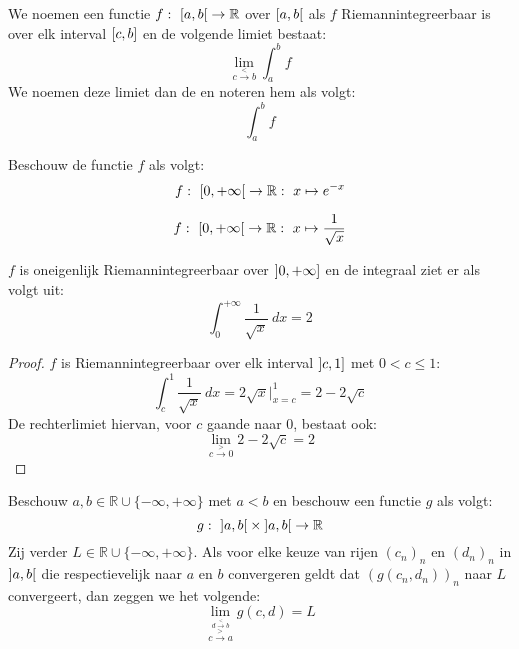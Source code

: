 \documentclass[main.tex]{subfiles}
\begin{document}
\begin{de}
  We noemen een functie $f:\ \interval[open right]{a}{b} \rightarrow \mathbb{R}$   over $\interval[open right]{a}{b}$ als $f$ Riemannintegreerbaar is over elk interval $\interval{c}{b}$ en de volgende limiet bestaat:
  \[ \lim_{c\overset{<}{\rightarrow} b}\int_{a}^{b}f \]
  We noemen deze limiet dan de  en noteren hem als volgt:
  \[ \int_{a}^{b}f \]
\end{de}

\begin{vb}
  Beschouw de functie $f$ als volgt:
  \[ f:\ \interval[open right]{0}{+\infty} \rightarrow \mathbb{R}:\ x \mapsto e^{-x}\]

  \noindent
  \begin{minipage}{.45\textwidth}
    \begin{figure}[H]
      \centering
    \end{figure}
  \end{minipage}
  \begin{minipage}{.45\textwidth}
    \[ f:\ \interval[open right]{0}{+\infty} \rightarrow \mathbb{R}:\ x \mapsto \frac{1}{\sqrt{x}} \]
  \end{minipage}

  $f$ is oneigenlijk Riemannintegreerbaar over $\interval[open left]{0}{+\infty}$ en de integraal ziet er als volgt uit:
  \[ \int_{0}^{+\infty}\frac{1}{\sqrt{x}}\ dx = 2 \]

  \begin{proof}
    $f$ is Riemannintegreerbaar over elk interval $\interval[open left]{c}{1}$ met $0 < c \le 1$:
    \[ \int_{c}^{1}\frac{1}{\sqrt{x}}\ dx = 2\sqrt{x}\big|_{x=c}^{1} = 2-2\sqrt{c} \]
    De rechterlimiet hiervan, voor $c$ gaande naar $0$, bestaat ook:
    \[ \lim_{c \overset{>}{\rightarrow} 0} 2-2\sqrt{c} = 2 \]
  \end{proof}
\end{vb}

\begin{de}
  Beschouw $a,b \in \mathbb{R} \cup \{ -\infty, +\infty \}$ met $a < b$ en beschouw een functie $g$ als volgt:
  \[ g:\ \interval[open]{a}{b} \times \interval[open]{a}{b} \rightarrow \mathbb{R} \]
  Zij verder $L \in \mathbb{R} \cup \{ -\infty, +\infty \}$.
  Als voor elke keuze van rijen $(c_{n})_{n}$ en $(d_{n})_{n}$ in $\interval[open]{a}{b}$ die respectievelijk naar $a$ en $b$ convergeren geldt dat $(g(c_{n},d_{n}))_{n}$ naar $L$ convergeert, dan zeggen we het volgende:
  \[ \lim_{\overset{d \overset{<}{\rightarrow} b}{c\overset{>}{\rightarrow} a}} g(c,d) = L \]
\end{de}
\end{document}
